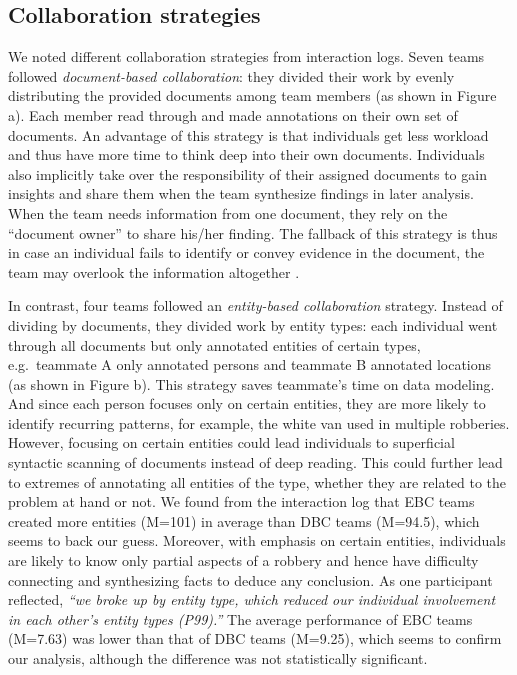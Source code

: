 \subsection{Collaboration strategies}\label{collaboration-strategies}

We noted different collaboration strategies from interaction logs. Seven
teams followed \emph{document-based collaboration}: they divided their
work by evenly distributing the provided documents among team members
(as shown in Figure \autocite{fig:labor_division}a). Each member read
through and made annotations on their own set of documents. An advantage
of this strategy is that individuals get less workload and thus have
more time to think deep into their own documents. Individuals also
implicitly take over the responsibility of their assigned documents to
gain insights and share them when the team synthesize findings in later
analysis. When the team needs information from one document, they rely
on the ``document owner'' to share his/her finding. The fallback of this
strategy is thus in case an individual fails to identify or convey
evidence in the document, the team may overlook the information
altogether \autocite{Borge2012}.

In contrast, four teams followed an \emph{entity-based collaboration}
strategy. Instead of dividing by documents, they divided work by entity
types: each individual went through all documents but only annotated
entities of certain types, e.g.~teammate A only annotated persons and
teammate B annotated locations (as shown in Figure
\autocite{fig:labor_division}b). This strategy saves teammate's time on
data modeling. And since each person focuses only on certain entities,
they are more likely to identify recurring patterns, for example, the
white van used in multiple robberies. However, focusing on certain
entities could lead individuals to superficial syntactic scanning of
documents instead of deep reading. This could further lead to extremes
of annotating all entities of the type, whether they are related to the
problem at hand or not. We found from the interaction log that EBC teams
created more entities (M=101) in average than DBC teams (M=94.5), which
seems to back our guess. Moreover, with emphasis on certain entities,
individuals are likely to know only partial aspects of a robbery and
hence have difficulty connecting and synthesizing facts to deduce any
conclusion. As one participant reflected, \emph{``we broke up by entity
type, which reduced our individual involvement in each other's entity
types (P99).''} The average performance of EBC teams (M=7.63) was lower
than that of DBC teams (M=9.25), which seems to confirm our analysis,
although the difference was not statistically significant.

